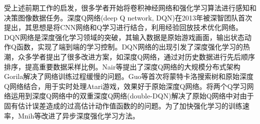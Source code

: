 受上述前期工作的启发，很多学者开始将卷积神经网络和强化学习算法进行感知和决策图像数据任务。深度Q网络(deep Q network, DQN)\cite{Mnih2013Playing}在2013年被深智团队首次提出，其思想是将CNN网络和Q学习进行结合，利用经验回放技术优化网络。DQN网络是深度强化学习领域的突破，其输入数据是原始游戏画面，输出状态动作Q函数，实现了端到端的学习控制。DQN网络的出现引发了深度强化学习的热潮，众多学者提出了很多改进方案，如深度Q网络\cite{Schaul2015Prioritized}，通过对历史数据进行先后顺序排序，提高重要数据采样比例。Nair等提出了深度Q网络的大规模分布式架构Gorila\cite{Goeringer2013Massively}解决了网络训练过程缓慢的问题。Guo等首次将蒙特卡洛搜索树和原始深度Q网络结合\cite{Guo2014Deep}，用于实时处理Atari游戏，效果好于原始深度Q网络。将两个Q学习网络运用到深度Q网络中的双重深度Q网络(double-DQN)\cite{DQN}解决了原始Q网络中对由于固有估计误差造成的过高估计动作值函数的的问题。为了加快强化学习的训练速率，Mnih等改进了异步深度强化学习方法\cite{Mnih2016Asynchronous}。
